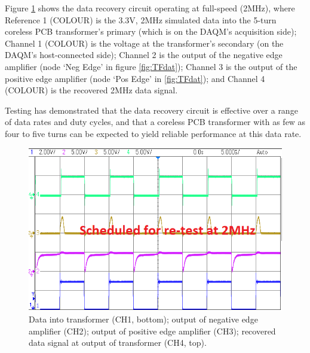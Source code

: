\documentclass[conference]{IEEEtran}
\begin{document}
	Figure \ref{fig:Data} shows the data recovery circuit operating at full-speed (2MHz), where Reference 1 (COLOUR) is the 3.3V, 2MHz simulated data into the 5-turn coreless PCB transformer's primary (which is on the DAQM's acquisition side); Channel 1 (COLOUR) is the voltage at the transformer's secondary (on the DAQM's host-connected side); Channel 2 is the output of the negative edge amplifier (node `Neg Edge' in figure \ref{fig:TFdat}); Channel 3 is the output of the positive edge amplifier (node `Pos Edge' in \ref{fig:TFdat}); and Channel 4 (COLOUR) is the recovered 2MHz data signal.
	
	Testing has demonstrated that the data recovery circuit is effective over a range of data rates and duty cycles, and that a coreless PCB transformer with as few as four to five turns can be expected to yield reliable performance at this data rate.
	
	\begin{figure}[t]
		\centering
		\includegraphics[width=0.8\columnwidth]{./img/DataCroppedREQUPD}
		\caption{Data into transformer (CH1, bottom); output of negative edge amplifier (CH2); output of positive edge amplifier (CH3); recovered data signal at output of transformer (CH4, top).}
		\label{fig:Data}
	\end{figure}
\end{document}
